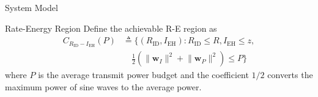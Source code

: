 \documentclass[journal]{IEEEtran}
\begin{document}
\begin{section}{System Model}
	\begin{subsection}{Rate-Energy Region}
		Define the achievable R-E region as
		\begin{equation}
			\begin{split}
				C_{R_{\text{ID}}-I_{\text{EH}}}(P)
				&\triangleq \biggl\{(R_{\text{ID}}, I_{\text{EH}}): R_{\text{ID}} \le R, I_{\text{EH}} \le z,\\
				&\quad \frac{1}{2}\left(\lVert{\boldsymbol{w}_I}\rVert^2+\lVert{\boldsymbol{w}_P}\rVert^2\right) \le P\biggr\}
			\end{split}
		\end{equation}
		where $P$ is the average transmit power budget and the coefficient $1/2$ converts the maximum power of sine waves to the average power.
	\end{subsection}
\end{section}
\end{document}
